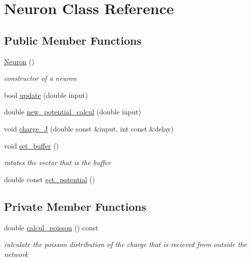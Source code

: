 \hypertarget{class_neuron}{}\section{Neuron Class Reference}
\label{class_neuron}
\subsection*{Public Member Functions}
\begin{DoxyCompactItemize}
\item 
\mbox{\label{class_neuron_a823487d01615fadb8ac19a2768dd9d96}} 
\hyperlink{class_neuron_a823487d01615fadb8ac19a2768dd9d96}{Neuron} ()
\begin{DoxyCompactList}\small\item\em constructor of a neuron \end{DoxyCompactList}\item 
bool \hyperlink{class_neuron_abad446d547800d3ba15a2da374fe409e}{update} (double input)
\item 
double \hyperlink{class_neuron_a689b33332f090aab40360f53c8bcfac6}{new\+\_\+potential\+\_\+calcul} (double input)
\item 
void \hyperlink{class_neuron_abfc4d63f88dd429dbd0d9dd379e232a0}{charge\+\_\+J} (double const \&input, int const \&delay)
\item 
\mbox{\label{class_neuron_a6432f7cc92b4c6ccb6321eac1caefd70}} 
void \hyperlink{class_neuron_a6432f7cc92b4c6ccb6321eac1caefd70}{set\+\_\+buffer} ()
\begin{DoxyCompactList}\small\item\em rotates the vector that is the buffer \end{DoxyCompactList}\item 
double const \hyperlink{class_neuron_a96dcaec2f9146dedd3f926d35b2c08f4}{get\+\_\+potential} ()
\end{DoxyCompactItemize}
\subsection*{Private Member Functions}
\begin{DoxyCompactItemize}
\item 
\mbox{\label{class_neuron_aa041a07cbcde2d11672e2719f9142f88}} 
double \hyperlink{class_neuron_aa041a07cbcde2d11672e2719f9142f88}{calcul\+\_\+poisson} () const
\begin{DoxyCompactList}\small\item\em calculate the poisson distribution of the charge that is recieved from outside the network \end{DoxyCompactList}\end{DoxyCompactItemize}
